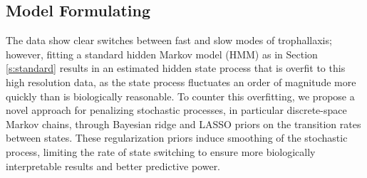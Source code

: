 \documentclass[smallextended]{svjour3}       %
\begin{document}
\subsection{Model Formulating} 
The data show clear switches between fast and slow modes of trophallaxis; however, fitting a standard hidden Markov model (HMM) as in Section \ref{s:standard} results in an estimated hidden state process that is overfit to this high resolution data, as the state process fluctuates an order of magnitude more quickly than is biologically reasonable. To counter this overfitting, we propose a novel approach for penalizing stochastic processes, in particular discrete-space Markov chains, through Bayesian ridge and LASSO priors on the transition rates between states. These regularization priors induce smoothing of the stochastic process, limiting the rate of state switching to ensure more biologically interpretable results and better predictive power. 
\end{document}
